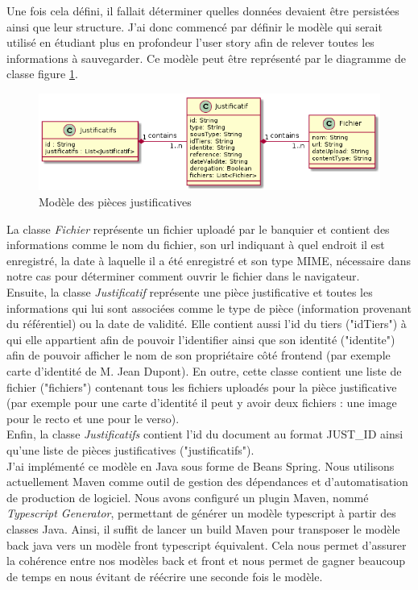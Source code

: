 	Une fois cela défini, il fallait déterminer quelles données devaient être persistées ainsi que leur structure. J'ai donc commencé par définir le modèle qui serait utilisé en étudiant plus en profondeur l'user story afin de relever toutes les informations à sauvegarder. Ce modèle peut être représenté par le diagramme de classe figure \ref{modelePJ}.	
	
\begin{figure}[h!]
	\includegraphics[scale=0.7]{images/travailBP1818/piecesJustif/modelePJ.png}
	\centering
	\caption{Modèle des pièces justificatives}
	\label{modelePJ}
\end{figure}

	La classe \textit{Fichier} représente un fichier uploadé par le banquier et contient des informations comme le nom du fichier, son url indiquant à quel endroit il est enregistré, la date à laquelle il a été enregistré et son type MIME, nécessaire dans notre cas pour déterminer comment ouvrir le fichier dans le navigateur. \\
	
	Ensuite, la classe \textit{Justificatif} représente une pièce justificative et toutes les informations qui lui sont associées comme le type de pièce (information provenant du référentiel) ou la date de validité. Elle contient aussi l'id du tiers ("idTiers") à qui elle appartient afin de pouvoir l'identifier ainsi que son identité ("identite") afin de pouvoir afficher le nom de son propriétaire côté frontend (par exemple carte d'identité de M. Jean Dupont). En outre, cette classe contient une liste de fichier ("fichiers") contenant tous les fichiers uploadés pour la pièce justificative (par exemple pour une carte d'identité il peut y avoir deux fichiers : une image pour le recto et une pour le verso). \\
	
	Enfin, la classe \textit{Justificatifs} contient l'id du document au format JUST\_ID ainsi qu'une liste de pièces justificatives ("justificatifs"). \\
	
	J'ai implémenté ce modèle en Java sous forme de Beans Spring. Nous utilisons actuellement Maven comme outil de gestion des dépendances et d'automatisation de production de logiciel. Nous avons configuré un plugin Maven, nommé \textit{Typescript Generator}, permettant de générer un modèle typescript à partir des classes Java. Ainsi, il suffit de lancer un build Maven pour transposer le modèle back java vers un modèle front typescript équivalent. Cela nous permet d'assurer la cohérence entre nos modèles back et front et nous permet de gagner beaucoup de temps en nous évitant de réécrire une seconde fois le modèle.
	  
